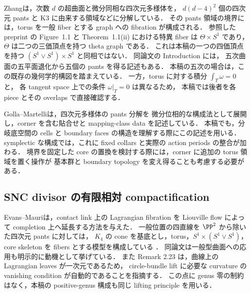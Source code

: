 Zhang\cite[Theorem 1.1]{Zhang}は，次数 $d$ の超曲面と微分同相な四次元多様体を，
$d(d-4)^2$ 個の四次元 pants と K3 に由来する領域などに分解している．
その pants 領域の境界には，torus を一般 fiber とする graph への fibration が構成される．
参照した preprint の Figure~1.1 と Theorem~1.1(ii) における特異 fiber は
$\Theta\times S^1$ であり，$\Theta$ は二つの三価頂点を持つ theta graph である．
これは本稿の一つの四価頂点を持つ $(S^1\vee S^1)\times S^1$ と同相ではない．
同論文の Introduction には，
五次曲面の五平面退化から五個の pants を得る記述もある．
本稿の五次の場合は，この既存の幾何学的構図を踏まえている．
一方，torus に対する積分 $\int_T\omega=0$ と，
各 tangent space 上での条件 $\omega|_T=0$ は異なるため，
本稿では後者を各 piece とその overlaps で直接確認する．

Golla--Martelli\cite{GollaMartelli}は，四次元多様体の pants 分解を
微分位相的な構成法として展開し，corner を含む貼合せと mapping-class data を記述している．
本稿でも，分岐底空間の cells と boundary faces の構造を理解する際にこの記述を用いる．
symplectic な構成では，これに fixed collars と実際の action periods の整合が加わる．
境界を固定した core の置換を検討する際には，corner に追加の torus 領域を置く操作が
基本群と boundary topology を変え得ることも考慮する必要がある．

\subsection{SNC divisor の有限相対 compactification}

Evans--Mauri\cite{EM}は，contact link 上の Lagrangian fibration を
Liouville flow によって completion 上へ延長する方法を与えた．
一般位置の四直線を $\PP^2$ から除いた四次元 pants に対しては，
$K_4$ の cone を基底とし，torus，$S^1\times(S^1\vee S^1)$，
core skeleton を fibers とする模型を構成している
\cite[Lemmas 2.16, 2.22; \S3.1]{EM}．
同論文は一般型曲面への応用も明示的に動機として挙げている．
また Remark 2.23 は，曲線上の Lagrangian leaves が一次元であるため，
circle-bundle lift に必要な curvature の vanishing condition が自動的であることを指摘する．
この点に genus 零の制約はなく，本稿の positive-genus 構成も同じ lifting principle を用いる．

